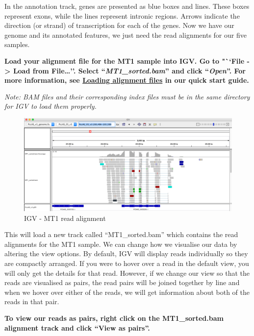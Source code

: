\documentclass[11pt]{article}
\begin{document}
    In the annotation track, genes are presented as blue boxes and lines.
These boxes represent exons, while the lines represent intronic regions.
Arrows indicate the direction (or strand) of transcription for each of
the genes. Now we have our genome and its annotated features, we just
need the read alignments for our five samples.

\newpage

\textbf{Load your alignment file for the MT1 sample into IGV. Go to
"``File -\textgreater{} Load from File\ldots{}''. Select
``\textit{MT1\_sorted.bam}'' and click ``\textit{Open}''. For more
information, see
\href{https://github.com/sanger-pathogens/pathogen-informatics-training/blob/master/Notebooks/IGV/index.ipynb}{Loading
alignment files} in our quick start guide.}

\textit{Note: BAM files and their corresponding index files must be in the
same directory for IGV to load them properly.}

    \begin{figure}[!h]
\centering
\includegraphics{images/igv-mt1.png}
\caption{IGV - MT1 read alignment}
\end{figure}

    This will load a new track called ``MT1\_sorted.bam'' which contains the
read alignments for the MT1 sample. We can change how we visualise our
data by altering the view options. By default, IGV will display reads
individually so they are compactly arranged. If you were to hover over a
read in the default view, you will only get the details for that read.
However, if we change our view so that the reads are visualised as
pairs, the read pairs will be joined together by line and when we hover
over either of the reads, we will get information about both of the
reads in that pair.

    \textbf{To view our reads as pairs, right click on the MT1\_sorted.bam
alignment track and click ``View as pairs''.}
\end{document}
